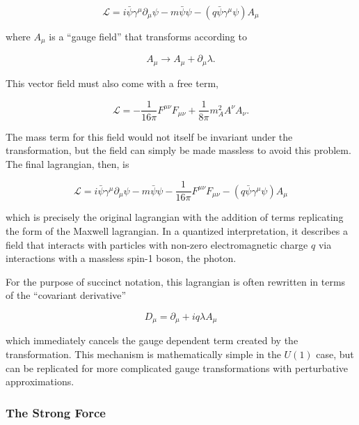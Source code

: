 \begin{equation}
\mathcal{L} = i\bar{\psi}\gamma^\mu \partial_\mu\psi - m \bar{\psi}\psi - (q\bar{\psi}\gamma^\mu\psi)A_\mu
\end{equation}

where $A_\mu$ is a ``gauge field'' that transforms according to 

\begin{equation}
A_\mu \rightarrow A_\mu + \partial_\mu \lambda . 
\end{equation}

This vector field must also come with a free term, 

\begin{equation}
\mathcal{L} = -\frac{1}{16\pi}F^{\mu\nu}F_{\mu\nu} + \frac{1}{8\pi}m_A^2A^\nu A_\nu . 
\end{equation}

The mass term for this field would not itself be invariant under the transformation, but the field can simply be made massless to avoid this problem. The final lagrangian, then, is 

\begin{equation}
\mathcal{L} = i\bar{\psi}\gamma^\mu \partial_\mu\psi - m \bar{\psi}\psi -\frac{1}{16\pi}F^{\mu\nu}F_{\mu\nu} - (q\bar{\psi}\gamma^\mu\psi)A_\mu
\label{eq:l_em}
\end{equation}

which is precisely the original lagrangian with the addition of terms replicating the form of the Maxwell lagrangian. In a quantized interpretation, it describes a field that interacts with particles with non-zero electromagnetic charge $q$ via interactions with a massless spin-1 boson, the photon. 

For the purpose of succinct notation, this lagrangian is often rewritten in terms of the ``covariant derivative''

\begin{equation}
D_\mu = \partial_\mu + iq\lambda A_\mu
\end{equation}

which immediately cancels the gauge dependent term created by the transformation. This mechanism is mathematically simple in the $U(1)$ case, but can be replicated for more complicated gauge transformations with perturbative approximations. 


\subsubsection{The Strong Force}
\label{sec:strong}

